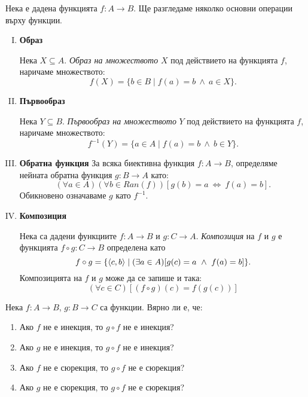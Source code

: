 Нека е дадена функцията $f:A\to B$.
Ще разгледаме няколко основни операции върху функции.
\begin{enumerate}[I)]
\item
  {\bf Образ}
  
  Нека $X\subseteq A$. {\em Образ на множеството} $X$ под действието на функцията $f$, наричаме
  множеството: \[f(X) = \{b\in B \mid f(a) = b\ \wedge\ a \in X\}.\]
\item
  {\bf Първообраз}

  Нека $Y\subseteq B$. {\em Първообраз на множеството} $Y$ под действието на функцията $f$, наричаме
  множеството: \[f^{-1}(Y) = \{a\in A \mid f(a) = b\ \wedge\ b \in Y\}.\]
\item
  {\bf Обратна функция}
  За всяка биективна функция $f:A\to B$, определяме нейната обратна функция $g:B \to  A$ като:
  \[(\forall a \in A)(\forall b \in Ran(f))[g(b) = a\ \iff\ f(a) = b].\]
  Обикновено означаваме $g$ като $f^{-1}$.

  
  
\item
  {\bf Композиция}

  Нека са дадени функциите $f:A\to B$ и $g:C\to A$.
  {\em Композиция} на $f$ и $g$ е функцията $f\circ g: C \to B$ определена като
  \[f\circ g = \{\langle{c,b}\rangle\mid (\exists a\in A)[g(c) = a\ \wedge\ f(a) = b]\}.\]
  Композицията на $f$ и $g$ може да се запише и така:
  \[(\forall c\in C)[(f\circ g)(c) = f(g(c))]\]
\end{enumerate}

\begin{prb}
  Нека $f: A\to B$, $g: B\to C$ са функции.
  Вярно ли е, че:
  \begin{enumerate}
  \item 
    Ако $f$  не е инекция, то $g\circ f$ не е инекция?
  \item
    Ако $g$  не е инекция, то $g\circ f$ не е инекция?
  \item 
    Ако $f$  не е сюрекция, то $g\circ f$ не е сюрекция?
  \item
    Ако $g$  не е сюрекция, то $g\circ f$ не е сюрекция?
  \end{enumerate}
\end{prb}

